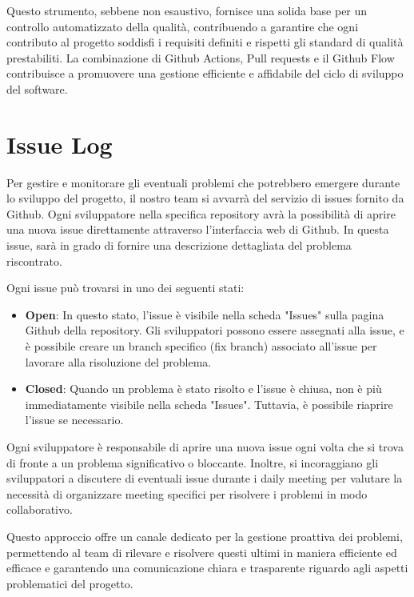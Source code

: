 Questo strumento, sebbene non esaustivo, fornisce una solida base per un controllo automatizzato della qualità, contribuendo a garantire che ogni contributo al progetto soddisfi i requisiti definiti e rispetti gli standard di qualità prestabiliti. La combinazione di Github Actions, Pull requests e il Github Flow contribuisce a promuovere una gestione efficiente e affidabile del ciclo di sviluppo del software.

\section{Issue Log}

Per gestire e monitorare gli eventuali problemi che potrebbero emergere durante lo sviluppo del progetto, il nostro team si avvarrà del servizio di issues fornito da Github. Ogni sviluppatore nella specifica repository avrà la possibilità di aprire una nuova issue direttamente attraverso l'interfaccia web di Github. In questa issue, sarà in grado di fornire una descrizione dettagliata del problema riscontrato.

Ogni issue può trovarsi in uno dei seguenti stati:

\begin{itemize}
    \item \textbf{Open}: In questo stato, l'issue è visibile nella scheda "Issues" sulla pagina Github della repository. Gli sviluppatori possono essere assegnati alla issue, e è possibile creare un branch specifico (fix branch) associato all'issue per lavorare alla risoluzione del problema.
    \item \textbf{Closed}: Quando un problema è stato risolto e l'issue è chiusa, non è più immediatamente visibile nella scheda "Issues". Tuttavia, è possibile riaprire l'issue se necessario.
\end{itemize}

Ogni sviluppatore è responsabile di aprire una nuova issue ogni volta che si trova di fronte a un problema significativo o bloccante. Inoltre, si incoraggiano gli sviluppatori a discutere di eventuali issue durante i daily meeting per valutare la necessità di organizzare meeting specifici per risolvere i problemi in modo collaborativo.

Questo approccio offre un canale dedicato per la gestione proattiva dei problemi, permettendo al team di rilevare e risolvere questi ultimi in maniera efficiente ed efficace e garantendo una comunicazione chiara e trasparente riguardo agli aspetti problematici del progetto.